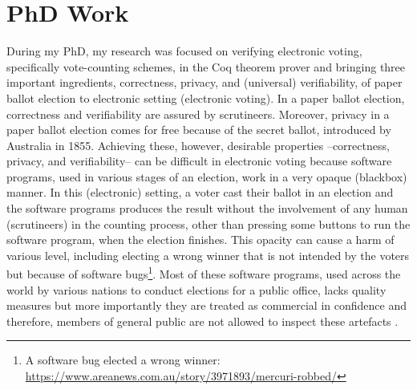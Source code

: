 \documentclass[a4paper]{article}
\begin{document}
\section{PhD Work}
During my PhD, my research was focused on verifying electronic voting, specifically vote-counting schemes, in 
the Coq theorem prover
and bringing  three important ingredients, correctness, privacy, and (universal) verifiability, of paper ballot election to 
electronic setting (electronic voting). In a paper ballot election, correctness and verifiability are
assured by scrutineers. Moreover, privacy in a paper ballot election comes for free because of the secret 
ballot, introduced by Australia in 1855.  Achieving these, however, desirable properties --correctness, 
privacy, and verifiability-- can be difficult in 
electronic voting because software programs, used in 
various stages of an election, work in a very opaque (blackbox) manner. In this (electronic) setting, 
a voter cast their ballot in an election and the software programs produces the result without the involvement 
of any human (scrutineers) in the counting process, other than pressing some buttons to run the software program,
when the election finishes. This opacity can cause a harm of various level, including electing a 
wrong winner that is not intended by the voters but because 
of software bugs\footnote{A software bug elected a wrong winner: \url{https://www.areanews.com.au/story/3971893/mercuri-robbed/}}. Most of 
these software programs, used across the world by various nations to conduct elections for a public office, 
lacks quality measures \cite{10.1145/3014812.3014837, 9152765} but more importantly they are treated as commercial in confidence and therefore,
members of general public are not allowed to inspect these artefacts \cite{AEC:2013:LMM}.
\end{document}
